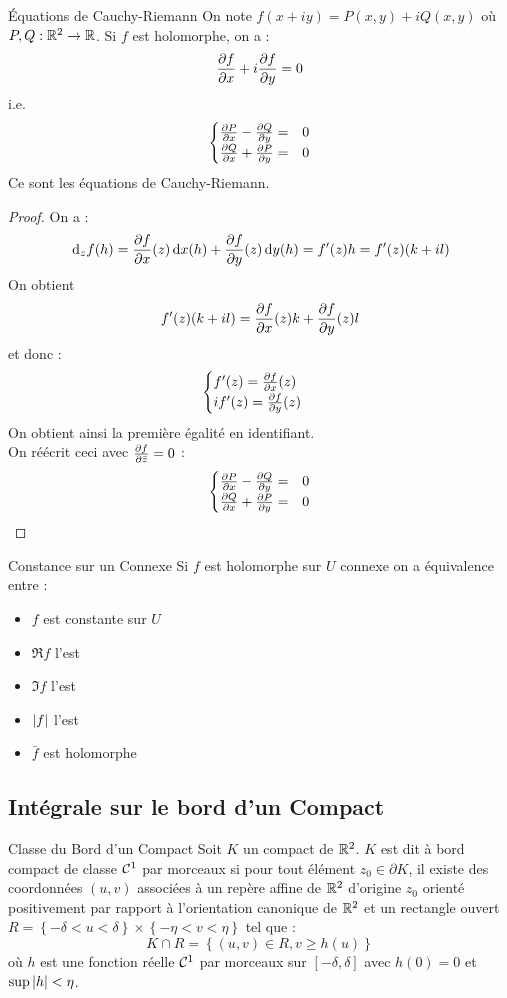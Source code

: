 \documentclass{cours}
\begin{document}
\begin{propositionfr}{Équations de Cauchy-Riemann}{}
	On note $f(x +iy) = P(x, y) + iQ(x, y)$ où $P, Q : \mathbb{R}^{2} \to \mathbb{R}$. Si $f$ est holomorphe, on a :  
	\[	
		\frac{\partial f}{\partial x} + i\frac{\partial f}{\partial y} = 0
	\]
	i.e. 
	\[
		\begin{cases}
			\frac{\partial P}{\partial x} - \frac{\partial Q}{\partial y} =& 0\\
			\frac{\partial Q}{\partial x} + \frac{\partial P}{\partial y} =& 0
		\end{cases}
	\]
	Ce sont les équations de Cauchy-Riemann.
\end{propositionfr}
\begin{proof}
	On a : 
	\[
		{\rm \, d}_{z}f(h) = \frac{\partial f}{\partial x}(z){\rm \, d} x(h) + \frac{\partial f}{\partial y}(z){\rm \, d} y(h) = f'(z)h = f'(z)(k + il)
	\]
	On obtient 
	\[	
		f'(z)(k + il) = \frac{\partial f}{\partial x}(z)k + \frac{\partial f}{\partial y}(z)l
	\]
	et donc : 
	\[
		\begin{cases}
			f'(z) = \frac{\partial f}{\partial x}(z)&\\
			if'(z) = \frac{\partial f}{\partial y}(z)
		\end{cases}
	\]
	On obtient ainsi la première égalité en identifiant.\\
	On réécrit ceci avec $\frac{\partial f}{\partial \bar{z}} = 0$ : 
	\[
		\begin{cases}
			\frac{\partial P}{\partial x} - \frac{\partial Q}{\partial y} =& 0\\
			\frac{\partial Q}{\partial x} + \frac{\partial P}{\partial y} =& 0
		\end{cases}
	\]
\end{proof}

\begin{propositionfr}{Constance sur un Connexe}{}
	Si $f$ est holomorphe sur $U$ connexe on a équivalence entre : 
	\begin{itemize}
		\item $f$ est constante sur $U$
		\item $\Re f$ l'est
		\item $\Im f$ l'est
		\item $\left|f\right|$ l'est
		\item $\bar{f}$ est holomorphe
	\end{itemize}
\end{propositionfr}

\subsection{Intégrale sur le bord d'un Compact}
\begin{définition}{Classe du Bord d'un Compact}{}
	Soit $K$ un compact de $\mathbb{R}^{2}$. $K$ est dit à bord compact de classe $\mathcal{C}^{1}$ par morceaux si pour tout élément $z_{0} \in \partial K$, il existe des coordonnées $(u, v)$ associées à un repère affine de $\mathbb{R}^{2}$ d'origine $z_{0}$ orienté positivement par rapport à l'orientation canonique de $\mathbb{R}^{2}$ et un rectangle ouvert $R = \left\{ -\delta < u < \delta\right\} \times \left\{-\eta < v < \eta\right\}$ tel que : 
	\[	
		K \cap R = \left\{(u, v) \in R, v \geq h(u)\right\}
		\]
	où $h$ est une fonction réelle $\mathcal{C}^{1}$ par morceaux sur $\left[-\delta, \delta \right]$ avec $h(0) = 0$ et $\sup \left|h\right| < \eta$.
\end{définition}
\end{document}
